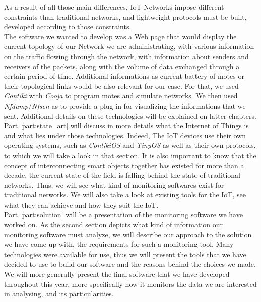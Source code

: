 As a result of all those main differences, IoT Networks impose different constraints than traditional networks, and lightweight protocols must be built, developed according to those constraints.\\

The software we wanted to develop was a Web page that would display the current topology of our Network we are administrating, with various information on the traffic flowing through the network, with information about senders and receivers of the packets, along with the volume of data exchanged through a certain period of time. Additional informations as current battery of motes or their topological links would be also relevant for our case. For that, we used \textit{Contiki} with \textit{Cooja} to program motes and simulate networks. We then used \textit{Nfdump}/\textit{Nfsen} as to provide a plug-in for visualizing the informations that we sent. Additional details on these technologies will be explained on latter chapters.\\

Part \ref{part:state_art} will discuss in more details what the Internet of Things is and what lies under those technologies. Indeed, The IoT devices use their own operating systems, such as \textit{ContikiOS} and \textit{TinyOS} as well as their own protocols, to which we will take a look in that section. It is also important to know that the concept of interconnecting smart objects together has existed for more than a decade, the current state of the field is falling behind the state of traditional networks. Thus, we will see what kind of monitoring softwares exist for traditional networks. We will also take a look at existing tools for the IoT, see what they can achieve and how they suit the IoT.\\

Part \ref{part:solution} will be a presentation of the monitoring software we have worked on. As the second section depicts what kind of information our monitoring software must analyze, we will describe our approach to the solution we have come up with, the requirements for such a monitoring tool. Many technologies were available for use, thus we will present the tools that we have decided to use to build our software and the reasons behind the choices we made. We will more generally present the final software that we have developed throughout this year, more specifically how it monitors the data we are interested in analysing, and its particularities. \\

